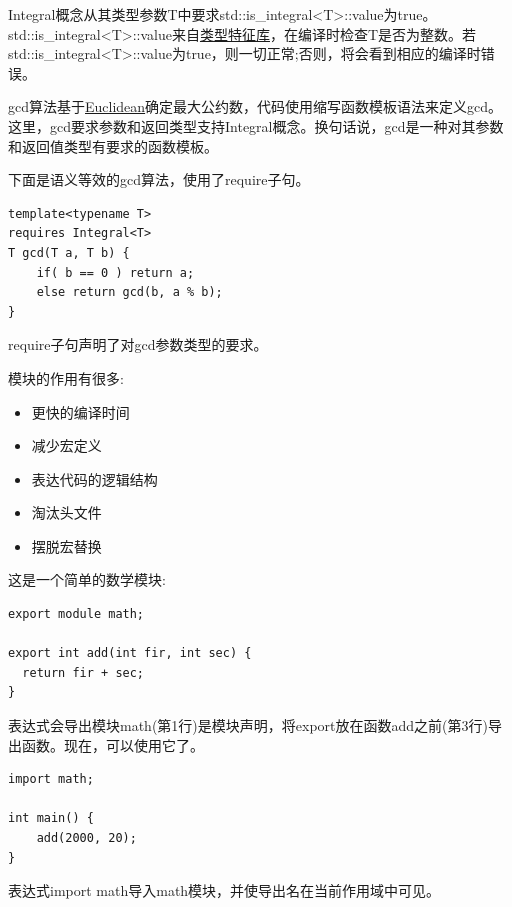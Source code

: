 Integral概念从其类型参数T中要求std::is\_integral<T>::value为true。std::is\_integral<T>::value来自\href{https://en.cppreference.com/w/cpp/header/type_traits}{类型特征库}，在编译时检查T是否为整数。若std::is\_integral<T>::value为true，则一切正常;否则，将会看到相应的编译时错误。

gcd算法基于\href{https://en.wikipedia.org/wiki/Euclid}{Euclidean}确定最大公约数，代码使用缩写函数模板语法来定义gcd。这里，gcd要求参数和返回类型支持Integral概念。换句话说，gcd是一种对其参数和返回值类型有要求的函数模板。

下面是语义等效的gcd算法，使用了require子句。

\begin{lstlisting}[style=styleCXX]
template<typename T>
requires Integral<T>
T gcd(T a, T b) {
	if( b == 0 ) return a;
	else return gcd(b, a % b);
}
\end{lstlisting}

require子句声明了对gcd参数类型的要求。


模块的作用有很多:

\begin{itemize}
\item 
更快的编译时间

\item 
减少宏定义

\item 
表达代码的逻辑结构

\item 
淘汰头文件

\item 
摆脱宏替换
\end{itemize}

这是一个简单的数学模块:

\begin{lstlisting}[style=styleCXX]
export module math;

export int add(int fir, int sec) {
  return fir + sec;
}
\end{lstlisting}

表达式会导出模块math(第1行)是模块声明，将export放在函数add之前(第3行)导出函数。现在，可以使用它了。

\begin{lstlisting}[style=styleCXX]
import math;

int main() {
	add(2000, 20);
}
\end{lstlisting}

表达式import math导入math模块，并使导出名在当前作用域中可见。

